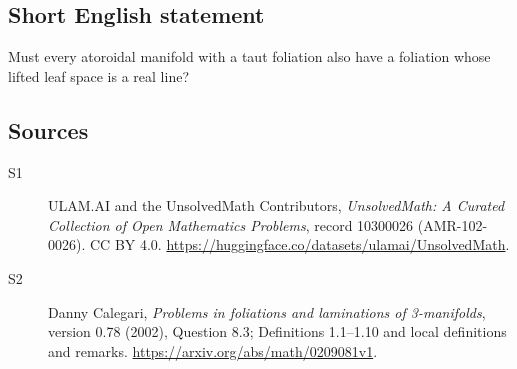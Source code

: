 \documentclass[11pt]{article}
\begin{document}
\subsection{Short English statement}
Must every atoroidal manifold with a taut foliation also have a foliation whose lifted leaf space is a real line?
\subsection{Sources}
\begin{description}
\item[\hypertarget{source:10300026:1}{S1}] ULAM.AI and the UnsolvedMath Contributors, \emph{UnsolvedMath: A Curated Collection of Open Mathematics Problems}, record 10300026 (AMR-102-0026). CC BY 4.0. \url{https://huggingface.co/datasets/ulamai/UnsolvedMath}.
\item[\hypertarget{source:10300026:2}{S2}] Danny Calegari, \emph{Problems in foliations and laminations of 3-manifolds}, version 0.78 (2002), Question 8.3; Definitions 1.1--1.10 and local definitions and remarks. \url{https://arxiv.org/abs/math/0209081v1}.
\end{description}
\label{end:10300026}
\end{document}
